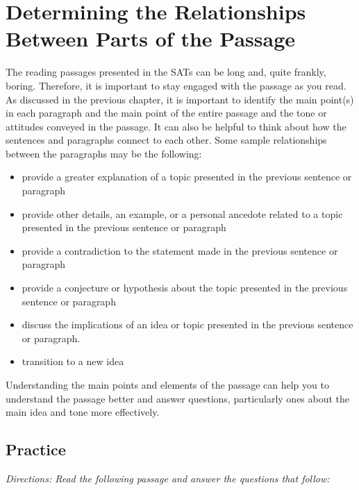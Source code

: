 \section{Determining the Relationships Between Parts of the Passage}

The reading passages presented in the SATs can be long and, quite frankly, boring. Therefore, it is important to stay engaged with the passage as you read. As discussed in the previous chapter, it is important to identify the main point(s) in each paragraph and the main point of the entire passage and the tone or attitudes conveyed in the passage. It can also be helpful to think about how the sentences and paragraphs connect to each other. Some sample relationships between the paragraphs may be the following:

\bigskip
\begin{itemize}
\item provide a greater explanation of a topic presented in the previous sentence or paragraph 

\bigskip
\item provide other details, an example, or a personal ancedote related to a topic presented in the previous sentence or paragraph

\bigskip
\item provide a contradiction to the statement made in the previous sentence or paragraph

\bigskip
\item provide a conjecture or hypothesis about the topic presented in the previous sentence or paragraph

\bigskip
\item discuss the implications of an idea or topic presented in the previous sentence or paragraph. 

\bigskip
\item transition to a new idea

\end{itemize}

Understanding the main points and elements of the passage can help you to understand the passage better and answer questions, particularly ones about the main idea and tone more effectively. 

\subsection{Practice}

\bigskip
\textit{Directions: Read the following passage and answer the questions that follow:}

